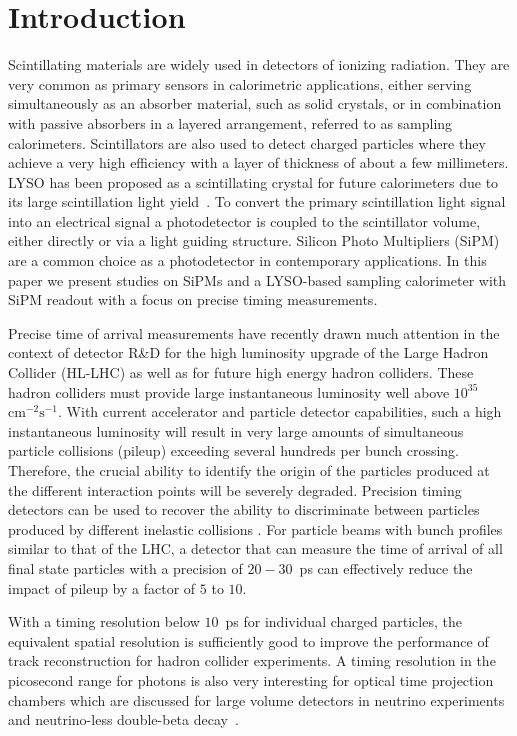 \section{Introduction}
\label{sec:introduction}

Scintillating materials are widely used in detectors of ionizing radiation. They
are very common as primary sensors in calorimetric applications, either serving
simultaneously as an absorber material, such as solid crystals, or in
combination with passive absorbers in a layered arrangement, referred to as
sampling calorimeters. Scintillators are also used to detect charged particles
where they achieve a very high efficiency with a layer of thickness of about a
few millimeters. LYSO has been proposed as a scintillating crystal for future
calorimeters due to its large scintillation light yield~\cite{LYSOProperties,
Yang:2015nsa}. To convert the primary scintillation light signal into an
electrical signal a photodetector is coupled to the scintillator volume, either
directly or via a light guiding structure. Silicon Photo Multipliers (SiPM) are
a common choice as a photodetector in contemporary applications. In this paper
we present studies on SiPMs and a LYSO-based sampling calorimeter with
SiPM readout with a focus on precise timing measurements. 

Precise time of arrival measurements have recently drawn much attention in the 
context of detector R\&D for the high luminosity upgrade of the Large Hadron 
Collider (HL-LHC) as well as for future high energy hadron colliders.  
These hadron colliders must provide large 
instantaneous luminosity well above $10^{35}$~$\mathrm{cm}^{-2}\mathrm{s}^{-1}$.
With current accelerator and particle detector capabilities, such a high 
instantaneous luminosity will result in very large amounts
of simultaneous particle collisions (pileup) exceeding several hundreds per
bunch crossing. Therefore, the crucial ability to identify the origin 
of the particles produced at the different interaction points will be severely 
degraded. Precision timing detectors can be used to recover the ability to 
discriminate between particles produced by different inelastic collisions \cite{adielba}.
For particle beams with bunch profiles similar to that of the LHC, a detector 
that can measure the time of arrival of all final state particles 
with a precision of $20-30$~ps can effectively reduce the impact of
pileup by a factor of $5$ to $10$. 

With a timing resolution below $10$~ps for individual charged particles, the
equivalent spatial resolution is sufficiently good to improve the performance of
track reconstruction \cite{Neri:2016bng} for hadron collider experiments. A timing
resolution in the picosecond range for photons is also very interesting for optical time
projection chambers which are discussed for large volume detectors in neutrino
experiments and neutrino-less double-beta decay~\cite{Aberle:2013jba, otpc}. 

